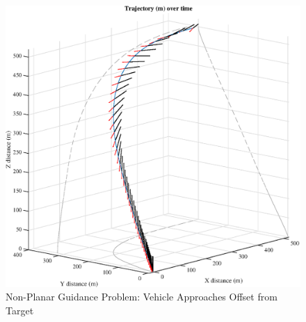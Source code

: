 \clearpage
\begin{figure}[!htbp] 
  \centering
  \includegraphics[width=\textwidth]{figs/nonplanar_3dtraj.eps}
  \caption{Non-Planar Guidance Problem: Vehicle Approaches Offset from Target}
  \label{fig:nplanar}
 \end{figure}


